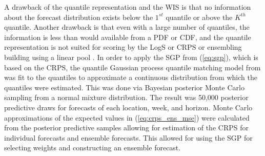 A drawback of the quantile representation and the WIS is that no information 
about the forecast distribution exists below the $1^{st}$ quantile or above 
the $K^{th}$ quantile. Another drawback is that even with a large number of 
quantiles, the information is less than would available from a PDF or CDF, 
and the quantile representation is not suited for scoring by the LogS or CRPS 
or ensembling building using a linear pool \cite[]{wadsworth2023mixture}.  
In order to apply the SGP from (\ref{eq:sgp}), which is based on the CRPS, 
the quantile 
Gaussian process quantile matching model from
\cite{wadsworth2025quantile} was fit to the quantiles to approximate a 
continuous
distribution from which the quantiles were estimated. This was done via 
Bayesian posterior Monte Carlo sampling from a normal mixture distribution. The 
result was 50,000 posterior predictive draws for forecasts of each location, 
week, and horizon. Monte Carlo approximations of the expected values in 
(\ref{eq:crps_ens_mse}) were calculated from the posterior predictive samples 
allowing for estimation of the CRPS for individual forecasts and ensemble 
forecasts. This allowed for using the SGP for selecting weights and 
constructing an ensemble forecast.

